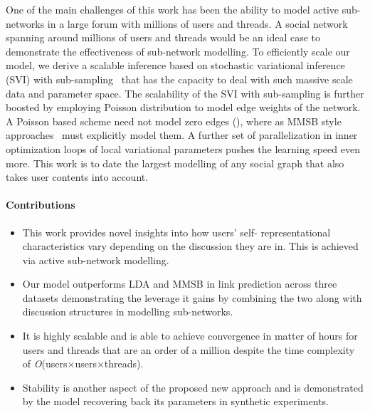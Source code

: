 \documentclass{sig-alternate}
\newcommand{\order}[1]{\textit{O}(#1)}
\begin{document}
One of the main challenges of this work has been the ability to model
active sub-networks in a large forum with millions of users and
threads. A social network spanning around millions of users and threads would 
be an ideal case to demonstrate the effectiveness of sub-network
modelling.
To efficiently scale our model, we derive a scalable inference based on
stochastic variational inference (SVI) with sub-sampling~\cite{Hoffman:2013:SVI} 
that has the capacity to deal with such massive scale data and parameter space.
 The scalability of the SVI
with sub-sampling is further boosted by employing Poisson distribution 
to model edge weights of
the network. A Poisson based scheme need not model zero edges
(\cite{Kerrer:Newman}), where as MMSB style approaches~\cite{Airoldi:2008:MMS:1390681.1442798}
 must explicitly model them.
A further set of
parallelization in inner optimization loops of local variational parameters
pushes the learning speed even more. This work is to date the largest 
modelling of any social graph that also takes user contents into
account. 

\paragraph{Contributions}
\begin{itemize}
  \item This work provides novel insights
into how users' self- representational characteristics vary
depending on the discussion they are in. This is achieved via active sub-network
modelling.
\item Our model outperforms LDA and MMSB in link prediction across three
datasets demonstrating the leverage it gains by combining the two along with discussion
structures in modelling sub-networks.
\item It is highly scalable and is able to achieve convergence in
matter of hours for users and threads that are an order of a million despite the
time complexity of \order{users$\times$users$\times$threads}.
\item  Stability
is another aspect of the proposed new approach and is demonstrated by
the model recovering back its parameters in synthetic experiments. 
\end{itemize} 




\end{document}
